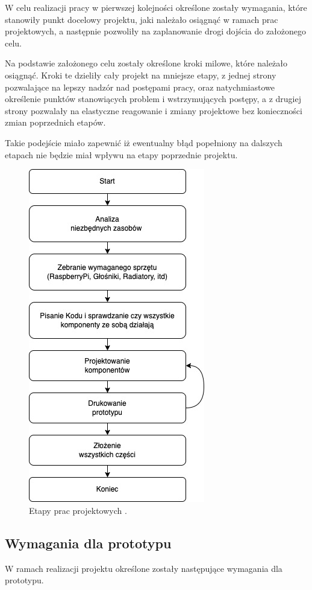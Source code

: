\documentclass[a4paper,12pt,reqno]{article}
\begin{document}
W celu realizacji pracy w pierwszej kolejności określone zostały wymagania, które stanowiły punkt docelowy projektu, jaki należało osiągnąć w ramach prac projektowych, a następnie pozwoliły na zaplanowanie drogi dojścia do założonego celu.

Na podstawie założonego celu zostały określone kroki milowe, które należało osiągnąć. Kroki te dzieliły cały projekt na mniejsze etapy, z jednej strony pozwalające na lepszy nadzór nad postępami pracy, oraz natychmiastowe określenie punktów stanowiących problem i wstrzymujących postępy, a z drugiej strony pozwalały na elastyczne reagowanie i zmiany projektowe bez konieczności zmian poprzednich etapów.

Takie podejście miało zapewnić iż ewentualny błąd popełniony na dalszych etapach nie będzie miał wpływu na etapy poprzednie projektu.

\begin{figure}[H]%
\centering
\includegraphics[width=0.5\columnwidth]{imgs/etapy.drawio.jpg}
\caption{Etapy prac projektowych \cite{img_me}. \label{etapypracy}}
\quad
\end{figure}

\subsection{Wymagania dla prototypu}

W ramach realizacji projektu określone zostały następujące wymagania dla prototypu.
\end{document}
